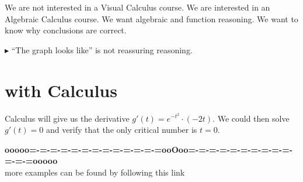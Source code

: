 \documentclass{ximera}
\begin{document}
We are not interested in a Visual Calculus course.  We are interested in an Algebraic Calculus course.  We want algebraic and function reasoning.  We want to know why conclusions are correct.

\textbf{\textcolor{red!80!black}{$\blacktriangleright$}} ``The graph looks like'' is not reassuring reasoning. 







\section{with Calculus}

Calculus will give us the derivative $g'(t) = e^{-t^2} \cdot (-2t)$.  We could then solve $g'(t) = 0$ and verify that the only critical number is $t = 0$.












\begin{center}
\textbf{\textcolor{green!50!black}{ooooo=-=-=-=-=-=-=-=-=-=-=-=-=ooOoo=-=-=-=-=-=-=-=-=-=-=-=-=ooooo}} \\

more examples can be found by following this link\\ 

\end{center}
\end{document}
